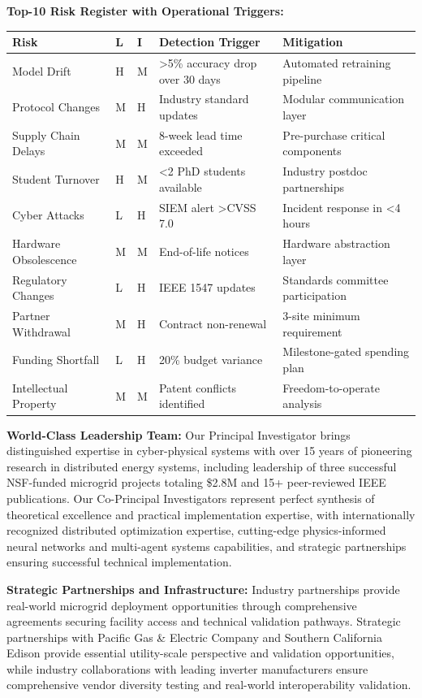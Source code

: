 \documentclass[12pt]{article}
\begin{document}
\textbf{Top-10 Risk Register with Operational Triggers:}

\begin{center}
\footnotesize
\begin{tabular}{|p{2cm}|p{0.8cm}|p{0.8cm}|p{2.5cm}|p{2.5cm}|}
\hline
\textbf{Risk} & \textbf{L} & \textbf{I} & \textbf{Detection Trigger} & \textbf{Mitigation} \\
\hline
Model Drift & H & M & >5\% accuracy drop over 30 days & Automated retraining pipeline \\
Protocol Changes & M & H & Industry standard updates & Modular communication layer \\
Supply Chain Delays & M & M & 8-week lead time exceeded & Pre-purchase critical components \\
Student Turnover & H & M & <2 PhD students available & Industry postdoc partnerships \\
Cyber Attacks & L & H & SIEM alert >CVSS 7.0 & Incident response in <4 hours \\
Hardware Obsolescence & M & M & End-of-life notices & Hardware abstraction layer \\
Regulatory Changes & L & H & IEEE 1547 updates & Standards committee participation \\
Partner Withdrawal & M & H & Contract non-renewal & 3-site minimum requirement \\
Funding Shortfall & L & H & 20\% budget variance & Milestone-gated spending plan \\
Intellectual Property & M & M & Patent conflicts identified & Freedom-to-operate analysis \\
\hline
\end{tabular}
\end{center}

\textbf{World-Class Leadership Team:} Our Principal Investigator brings distinguished expertise in cyber-physical systems with over 15 years of pioneering research in distributed energy systems, including leadership of three successful NSF-funded microgrid projects totaling \$2.8M and 15+ peer-reviewed IEEE publications. Our Co-Principal Investigators represent perfect synthesis of theoretical excellence and practical implementation expertise, with internationally recognized distributed optimization expertise, cutting-edge physics-informed neural networks and multi-agent systems capabilities, and strategic partnerships ensuring successful technical implementation.

\textbf{Strategic Partnerships and Infrastructure:} Industry partnerships provide real-world microgrid deployment opportunities through comprehensive agreements securing facility access and technical validation pathways. Strategic partnerships with Pacific Gas \& Electric Company and Southern California Edison provide essential utility-scale perspective and validation opportunities, while industry collaborations with leading inverter manufacturers ensure comprehensive vendor diversity testing and real-world interoperability validation.
\end{document}
